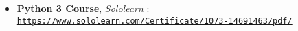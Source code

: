 
\begin{itemize}
\item \textbf{Python 3 Course}, \emph{Sololearn}
  : \\
  {\texttt{\href{https://www.sololearn.com/Certificate/1073-14691463/pdf/}{https://www.sololearn.com/Certificate/1073-14691463/pdf/}}}
  
  
  
  
\end{itemize}
